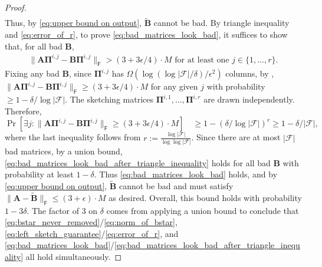 \documentclass{article}[11pt]
\theoremstyle{definition}
\newcommand{\bv}[1]{\boldsymbol{\mathbf{#1}}}
\newcommand{\Fro}{\mathsf{F}}
\newcommand{\F}{\mathcal{F}}
\begin{document}
\begin{proof}
\begin{align}
        \end{align}
        Thus, by \eqref{eq:upper bound on output},  
        $\bv{\tilde B}$ cannot be bad. By triangle inequality and \eqref{eq:error_of_r}, to prove \eqref{eq:bad_matrices_look_bad}, it suffices to show that, for all bad $\bv{B}$, 
        \begin{align}
            \label{eq:bad_matrices_look_bad_after_triangle_inequality}
        \|\bv{A}\bv{\Pi}^{i,j} - \bv{B}\bv{\Pi}^{i,j} \|_\Fro > (3+3\epsilon/4)\cdot M \text{ for at least one } j\in \{1, \ldots, r\}.
        \end{align}
        Fixing any bad $\bv{B}$, 
        since $\bv{\Pi}^{i,j}$ has $\Omega\left(\log(\log|\F|/\delta)/\epsilon^2\right)$ columns, by , $\|\bv{A}\bv{\Pi}^{i,j} - \bv{B}\bv{\Pi}^{i,j}\|_\Fro \geq (3+3\epsilon/4)\cdot M$ for any given $j$ with probability $\geq 1 - \delta/\log|\F|$.
        The sketching matrices $\bv{\Pi}^{i,1}, \ldots, \bv{\Pi}^{i,r}$ are drawn independently.
        Therefore,
        \[
        \Pr\left[\exists j : \|\bv{A}\bv{\Pi}^{i,j} - \bv{B}\bv{\Pi}^{i,j}\|_\Fro
        \geq (3+3\epsilon/4)\cdot M\right] \quad \geq 1 - (\delta / \log|\F|)^{r} \geq 1 - \delta / |\F|,
        \]
        where the last inequality follows from $r := \frac{\log|\F|}{\log \log |\F|}$.
        Since there are at most $|\F|$ bad matrices, by a union bound, \eqref{eq:bad_matrices_look_bad_after_triangle_inequality} holds for all bad $\bv{B}$ with probability at least $1 - \delta$. Thus \eqref{eq:bad_matrices_look_bad} holds, and by \eqref{eq:upper bound on output}, $\bv{\tilde B}$ cannot be bad and must satisfy $\|\bv{A} - \bv{\tilde B}\|_\Fro \leq (3+\epsilon)\cdot M$ as desired. Overall, this bound holds with probability $1-3\delta$. 
        The factor of 3 on $\delta$ comes from applying a union bound to conclude that \eqref{eq:bstar_never_removed}/\eqref{eq:norm_of_bstar}, \eqref{eq:left_sketch_guarantee}/\eqref{eq:error_of_r},
        and \eqref{eq:bad_matrices_look_bad}/\eqref{eq:bad_matrices_look_bad_after_triangle_inequality}
             all hold simultaneously.



\end{proof}
\end{document}
